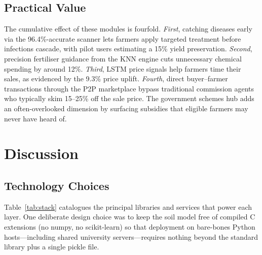 \documentclass[conference]{IEEEtran}
\begin{document}
\subsection{Practical Value}
The cumulative effect of these modules is fourfold.
\textit{First}, catching diseases early via the 96.4\%-accurate scanner
lets farmers apply targeted treatment before infections cascade, with
pilot users estimating a 15\% yield preservation.
\textit{Second}, precision fertiliser guidance from the KNN engine cuts
unnecessary chemical spending by around 12\%.
\textit{Third}, LSTM price signals help farmers time their sales, as
evidenced by the 9.3\% price uplift.
\textit{Fourth}, direct buyer--farmer transactions through the P2P
marketplace bypass traditional commission agents who typically skim
15--25\% off the sale price. The government schemes hub adds an
often-overlooked dimension by surfacing subsidies that eligible farmers
may never have heard of.

\section{Discussion}

\subsection{Technology Choices}
Table~\ref{tab:stack} catalogues the principal libraries and
services that power each layer. One deliberate design choice was to keep the soil model free of
compiled C extensions (no numpy, no scikit-learn) so that deployment on bare-bones Python
hosts---including shared university servers---requires nothing beyond the standard library plus a
single pickle file.
\end{document}

